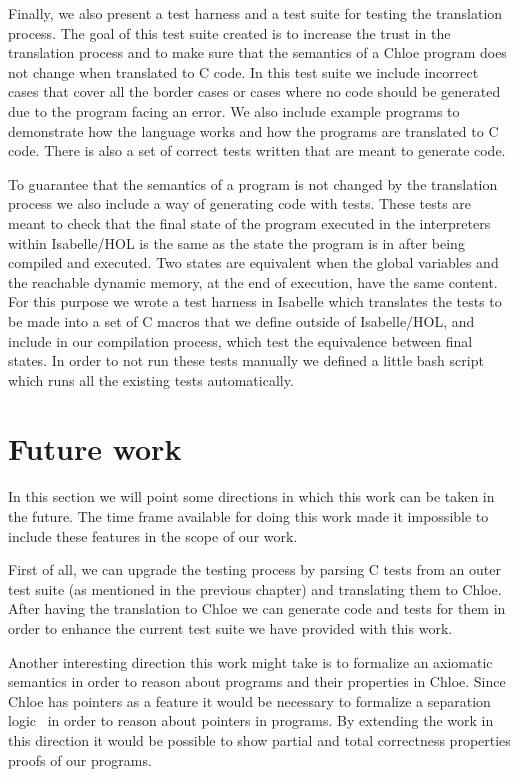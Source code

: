 Finally, we also present a test harness and a test suite for testing the translation process.
The goal of this test suite created is to increase the trust in the translation process and to make sure that the semantics of a Chloe program does not change when translated to C code.
In this test suite we include incorrect cases that cover all the border cases or cases where no code should be generated due to the program facing an error.
We also include example programs to demonstrate how the language works and how the programs are translated to C code.
There is also a set of correct tests written that are meant to generate code.

To guarantee that the semantics of a program is not changed by the translation process we also include a way of generating code with tests.
These tests are meant to check that the final state of the program executed in the interpreters within Isabelle/HOL is the same as the state the program is in after being compiled and executed.
Two states are equivalent when the global variables and the reachable dynamic memory, at the end of execution, have the same content.
For this purpose we wrote a test harness in Isabelle which translates the tests to be made into a set of C macros that we define outside of Isabelle/HOL, and include in our compilation process, which test the equivalence between final states.
In order to not run these tests manually we defined a little bash script which runs all the existing tests automatically.

\section{Future work}

In this section we will point some directions in which this work can be taken in the future.
The time frame available for doing this work made it impossible to include these features in the scope of our work.

First of all, we can upgrade the testing process by parsing C tests from an outer test suite (as mentioned in the previous chapter) and translating them to Chloe.
After having the translation to Chloe we can generate code and tests for them in order to enhance the current test suite we have provided with this work.

Another interesting direction this work might take is to formalize an axiomatic semantics in order to reason about programs and their properties in Chloe.
Since Chloe has pointers as a feature it would be necessary to formalize a separation logic~\parencite{sep-logic} in order to reason about pointers in programs.
By extending the work in this direction it would be possible to show partial and total correctness properties proofs of our programs.

